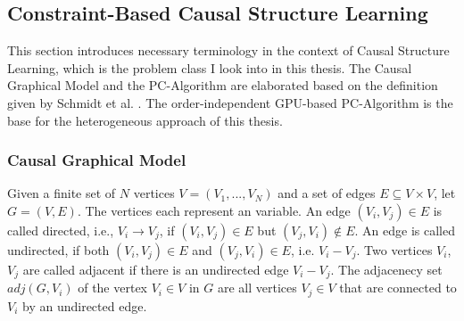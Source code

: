 \subsection{Constraint-Based Causal Structure Learning}
This section introduces necessary terminology in the context of Causal Structure Learning, which is the problem class I look into in this thesis. The Causal Graphical Model and the PC-Algorithm are elaborated based on the definition given by Schmidt et al. \cite{schmidtOrderIndependentConstraintBasedCausal2018}. The order-independent GPU-based PC-Algorithm is the base for the heterogeneous approach of this thesis.

\subsubsection{Causal Graphical Model}
Given a finite set of $N$ vertices $V = (V_1,...,V_N)$ and a set of edges $E \subseteq V \times V$, let $G = (V,E)$. The vertices each represent an variable. An edge $(V_i, V_j) \in E$ is called directed, i.e., $V_i \rightarrow V_j$, if $(V_i,V_j) \in E$ but $(V_j, V_i) \notin E$. An edge is called undirected, if both $(V_i,V_j) \in E$ and $(V_j, V_i) \in E$, i.e. $V_i - V_j$. Two vertices $V_i$, $V_j$ are called adjacent if there is an undirected edge $V_i - V_j$. The adjacenecy set $adj(G, V_i)$ of the vertex $V_i \in V$ in $G$ are all vertices $V_j \in V$ that are connected to $V_i$ by an undirected edge.

